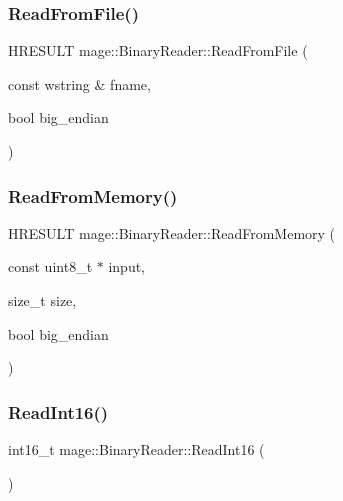 \hypertarget{classmage_1_1_binary_reader_ad1d395eabc03da0a52fc0df59623e0a4}{}\label{classmage_1_1_binary_reader_ad1d395eabc03da0a52fc0df59623e0a4} 
\subsubsection{\texorpdfstring{Read\+From\+File()}{ReadFromFile()}}
{\footnotesize\ttfamily H\+R\+E\+S\+U\+LT mage\+::\+Binary\+Reader\+::\+Read\+From\+File (\begin{DoxyParamCaption}\item[{const wstring \&}]{fname,  }\item[{bool}]{big\+\_\+endian }\end{DoxyParamCaption})}

\hypertarget{classmage_1_1_binary_reader_ac0bf066e76b7ac0f5308109ae431007d}{}\label{classmage_1_1_binary_reader_ac0bf066e76b7ac0f5308109ae431007d} 
\subsubsection{\texorpdfstring{Read\+From\+Memory()}{ReadFromMemory()}}
{\footnotesize\ttfamily H\+R\+E\+S\+U\+LT mage\+::\+Binary\+Reader\+::\+Read\+From\+Memory (\begin{DoxyParamCaption}\item[{const uint8\+\_\+t $\ast$}]{input,  }\item[{size\+\_\+t}]{size,  }\item[{bool}]{big\+\_\+endian }\end{DoxyParamCaption})}

\hypertarget{classmage_1_1_binary_reader_abb90a96c485b3acb1af3bb3bd88b76c5}{}\label{classmage_1_1_binary_reader_abb90a96c485b3acb1af3bb3bd88b76c5} 
\subsubsection{\texorpdfstring{Read\+Int16()}{ReadInt16()}}
{\footnotesize\ttfamily int16\+\_\+t mage\+::\+Binary\+Reader\+::\+Read\+Int16 (\begin{DoxyParamCaption}{ }\end{DoxyParamCaption})\hspace{0.3cm}{\ttfamily [protected]}}

